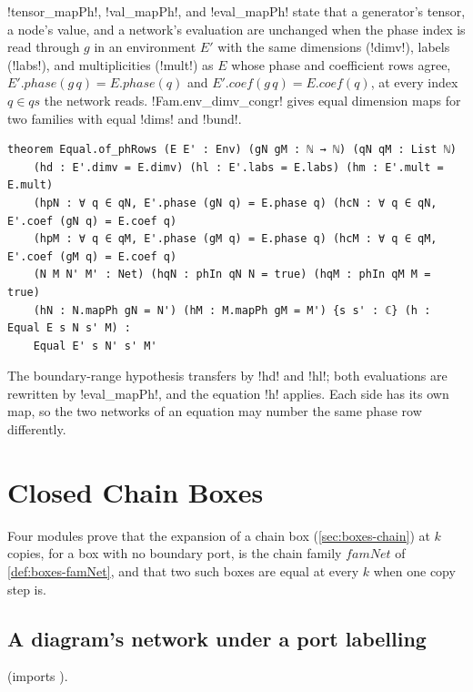 {\lbx!tensor_mapPh!, \lbx!val_mapPh!, and \lbx!eval_mapPh! state that a generator's tensor, a node's value, and a network's evaluation are unchanged when the phase index is read through $g$ in an environment $E'$ with the same dimensions (\lbx!dimv!), labels (\lbx!labs!), and multiplicities (\lbx!mult!) as $E$ whose phase and coefficient rows agree, $E'.\mathit{phase}(g\,q)=E.\mathit{phase}(q)$ and $E'.\mathit{coef}(g\,q)=E.\mathit{coef}(q)$, at every index $q\in\mathit{qs}$ the network reads. \lbx!Fam.env_dimv_congr! gives equal dimension maps for two families with equal \lbx!dims! and \lbx!bund!.

\begin{theorem}\label{thm:boxes-of-phRows}
\begin{lstlisting}[style=leanbox]
theorem Equal.of_phRows (E E' : Env) (gN gM : ℕ → ℕ) (qN qM : List ℕ)
    (hd : E'.dimv = E.dimv) (hl : E'.labs = E.labs) (hm : E'.mult = E.mult)
    (hpN : ∀ q ∈ qN, E'.phase (gN q) = E.phase q) (hcN : ∀ q ∈ qN, E'.coef (gN q) = E.coef q)
    (hpM : ∀ q ∈ qM, E'.phase (gM q) = E.phase q) (hcM : ∀ q ∈ qM, E'.coef (gM q) = E.coef q)
    (N M N' M' : Net) (hqN : phIn qN N = true) (hqM : phIn qM M = true)
    (hN : N.mapPh gN = N') (hM : M.mapPh gM = M') {s s' : ℂ} (h : Equal E s N s' M) :
    Equal E' s N' s' M'
\end{lstlisting}
\end{theorem}
\noindent The boundary-range hypothesis transfers by \lbx!hd! and \lbx!hl!; both evaluations are rewritten by \lbx!eval_mapPh!, and the equation \lbx!h! applies. Each side has its own map, so the two networks of an equation may number the same phase row differently.

\section{Closed Chain Boxes}\label{sec:boxes-closedchain}

Four modules prove that the expansion of a chain box (\cref{sec:boxes-chain}) at $k$ copies, for a box with no boundary port, is the chain family $\mathit{famNet}$ of \cref{def:boxes-famNet}, and that two such boxes are equal at every $k$ when one copy step is.

\subsection{A diagram's network under a port labelling}

 (imports ).

}
